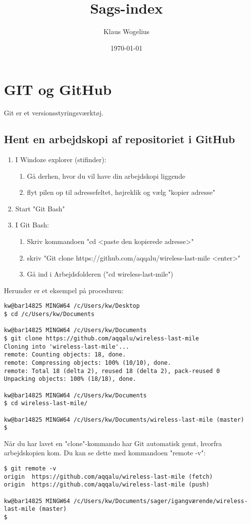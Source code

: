 \documentclass[11pt,a4paper,twoside]{report}
\title{Sags-index}
\author{Klaus Wogelius}
\date{\today}
\begin{document}
\maketitle
\tableofcontents

\chapter{GIT og GitHub}
Git er et versionsstyringsværktøj.
\section{Hent en arbejdskopi af repositoriet i GitHub}
\begin{enumerate}

 \item I Windoze explorer (stifinder):
 \begin{enumerate}
  \item Gå derhen, hvor du vil have din arbejdskopi liggende
  \item flyt pilen op til adressefeltet, højreklik og vælg "kopier adresse"
 \end{enumerate}
 \item Start "Git Bash"
 \item I Git Bash:
 \begin{enumerate}
  \item Skriv kommandoen "cd <paste den kopierede adresse>"
  \item skriv "Git clone https://github.com/aqqalu/wireless-last-mile <enter>"
  \item Gå ind i Arbejdsfolderen ("cd wireless-last-mile")
 \end{enumerate}
\end{enumerate}
Herunder er et eksempel på proceduren:
\begin{verbatim}
kw@bar14825 MINGW64 /c/Users/kw/Desktop
$ cd /c/Users/kw/Documents

kw@bar14825 MINGW64 /c/Users/kw/Documents
$ git clone https://github.com/aqqalu/wireless-last-mile
Cloning into 'wireless-last-mile'...
remote: Counting objects: 18, done.
remote: Compressing objects: 100% (10/10), done.
remote: Total 18 (delta 2), reused 18 (delta 2), pack-reused 0
Unpacking objects: 100% (18/18), done.

kw@bar14825 MINGW64 /c/Users/kw/Documents
$ cd wireless-last-mile/

kw@bar14825 MINGW64 /c/Users/kw/Documents/wireless-last-mile (master)
$
\end{verbatim}
\par
Når  du har lavet en "clone"-kommando har Git automatisk gemt, hvorfra arbejdskopien kom. Du kan se dette med kommandoen "remote -v":
\begin{verbatim}
$ git remote -v
origin  https://github.com/aqqalu/wireless-last-mile (fetch)
origin  https://github.com/aqqalu/wireless-last-mile (push)

kw@bar14825 MINGW64 /c/Users/kw/Documents/sager/igangværende/wireless-last-mile (master)
$ 
\end{verbatim}
\end{document}
